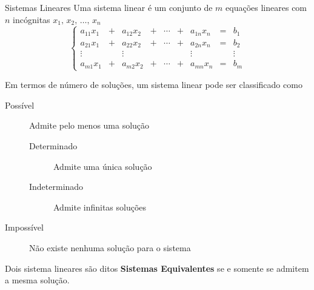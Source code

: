 \begin{teoria}{Sistemas Lineares}
    Uma sistema linear  é um conjunto de $m$ equações lineares com $n$ incógnitas $x_1,\,x_2,\,\dots,\,x_n$
    \[\left\{ 
    \begin{array}{ccccccccl}
        a_{11}x_1 & \!+\! &a_{12}x_2  & \!+\! &\cdots & \!+\! &a_{1n}x_n & \!=\! & b_1 \\ 
        a_{21}x_1 & \!+\! &a_{22}x_2  & \!+\! &\cdots & \!+\! &a_{2n}x_n & \!=\! & b_2 \\ 
        \vdots    &       &\vdots     &       &       &       &\vdots    &       & \vdots \\
        a_{m1}x_1 & \!+\! &a_{m2}x_2  & \!+\! &\cdots & \!+\! &a_{mn}x_n & \!=\! & b_m
    \end{array} 
    \right.
    \]
\end{teoria}

\begin{teoria}{}    
    Em termos de número de soluções, um sistema linear pode ser classificado como
    \begin{description}
        \item[Possível] Admite pelo menos uma solução
        \begin{description}
            \item[Determinado]   \tabto{22mm} Admite uma única solução
            \item[Indeterminado] \tabto{22mm} Admite infinitas soluções
        \end{description}
        \item[Impossível] Não existe nenhuma solução para o sistema 
    \end{description}
    
    Dois sistema lineares são ditos \textbf{Sistemas Equivalentes} se e somente se admitem a mesma solução.
\end{teoria}

